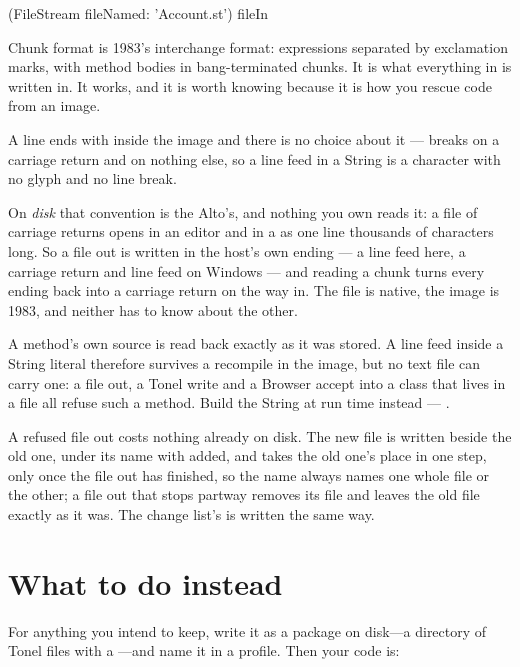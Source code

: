 \begin{st}
(FileStream fileNamed: 'Account.st') fileIn
\end{st}

Chunk format is 1983's interchange format: expressions separated by
exclamation marks, with method bodies in bang-terminated chunks. It is what
everything in  is written in. It works, and it is worth knowing
because it is how you rescue code from an image.

\begin{stnote}
A line ends with  inside the image and there is no choice
about it ---  breaks on a carriage return and on
nothing else, so a line feed in a String is a character with no glyph and no
line break.

On \emph{disk} that convention is the Alto's, and nothing you own reads it: a
file of carriage returns opens in an editor and in a  as one line
thousands of characters long. So a file out is written in the host's own
ending --- a line feed here, a carriage return and line feed on Windows ---
and reading a chunk turns every ending back into a carriage return on the way
in. The file is native, the image is 1983, and neither has to know about the
other.

A method's own source is read back exactly as it was stored. A line feed
inside a String literal therefore survives a recompile in the image, but no
text file can carry one: a file out, a Tonel write and a Browser accept into a
class that lives in a file all refuse such a method. Build the String at run
time instead --- .

A refused file out costs nothing already on disk. The new file is written
beside the old one, under its name with  added, and takes the old
one's place in one step, only once the file out has finished, so the name
always names one whole file or the other; a file out that stops partway
removes its  file and leaves the old file exactly as it was. The
change list's  is written the same way.
\end{stnote}

\section{What to do instead}

For anything you intend to keep, write it as a package on disk---a directory
of Tonel files with a ---and name it in a profile. Then your
code is:

